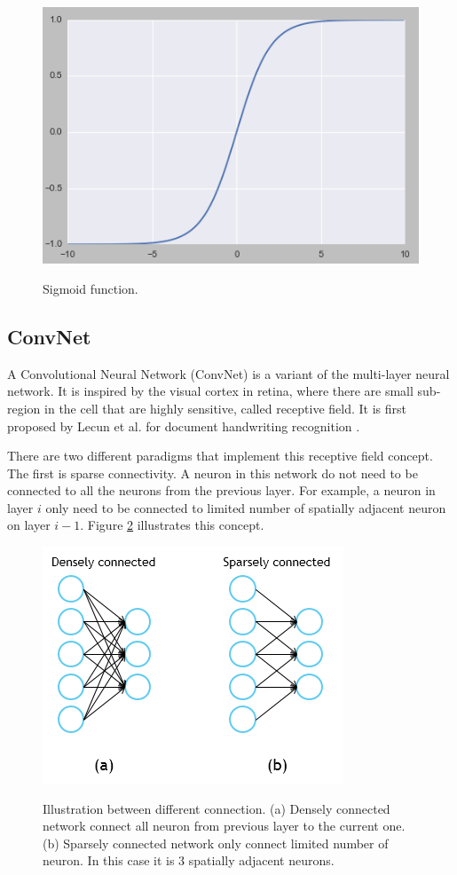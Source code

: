 \documentclass[a4paper,11pt]{kth-mag}
\begin{document}
\begin{figure}[h]
\centering
\includegraphics[scale=0.5]{image/sigmoid.png}
\label{fig:sigmoid}
\caption{Sigmoid function.}
\end{figure}

\subsection{ConvNet}
A Convolutional Neural Network (ConvNet) is a variant of the multi-layer neural network. It is inspired by the visual cortex in retina, where there are small sub-region in the cell that are highly sensitive, called receptive field. It is first proposed by Lecun et al. for document handwriting recognition \cite{lecun}.

There are two different paradigms that implement this receptive field concept. The first is sparse connectivity. A neuron in this network do not need to be connected to all the neurons from the previous layer. For example, a neuron in layer $i$ only need to be connected to limited number of spatially adjacent neuron on layer $i-1$. Figure \ref{fig:sparse} illustrates this concept.

\begin{figure}[h]
\centering
\includegraphics[scale=0.5]{image/sparse.png}
\label{fig:sparse}
\caption{Illustration between different connection. (a) Densely connected network connect all neuron from previous layer to the current one. (b) Sparsely connected network only connect limited number of neuron. In this case it is 3 spatially adjacent neurons.}
\end{figure}
\end{document}
